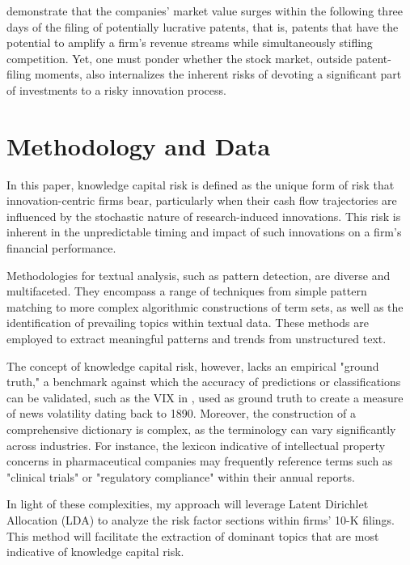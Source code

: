 \documentclass[12pt, letterpaper]{article}
\begin{document}
\citet{Kogan2017-fx} demonstrate that the companies' market value surges within the following three days of the filing of potentially lucrative patents, that is, patents that have the potential to amplify a firm's revenue streams while simultaneously stifling competition. Yet, one must ponder whether the stock market, outside patent-filing moments, also internalizes the inherent risks of devoting a significant part of investments to a risky innovation process.

\section{Methodology and Data}


In this paper, knowledge capital risk is defined as the unique form of risk that innovation-centric firms bear, particularly when their cash flow trajectories are influenced by the stochastic nature of research-induced innovations. This risk is inherent in the unpredictable timing and impact of such innovations on a firm's financial performance.

Methodologies for textual analysis, such as pattern detection, are diverse and multifaceted. They encompass a range of techniques from simple pattern matching to more complex algorithmic constructions of term sets, as well as the identification of prevailing topics within textual data. These methods are employed to extract meaningful patterns and trends from unstructured text.

The concept of knowledge capital risk, however, lacks an empirical "ground truth," a benchmark against which the accuracy of predictions or classifications can be validated, such as the VIX in \cite{Manela2017-lj}, used as ground truth to create a measure of news volatility dating back to 1890. Moreover, the construction of a comprehensive dictionary is complex, as the terminology can vary significantly across industries. For instance, the lexicon indicative of intellectual property concerns in pharmaceutical companies may frequently reference terms such as "clinical trials" or "regulatory compliance" within their annual reports.

In light of these complexities, my approach will leverage Latent Dirichlet Allocation (LDA) to analyze the risk factor sections within firms' 10-K filings. This method will facilitate the extraction of dominant topics that are most indicative of knowledge capital risk. 
\end{document}
